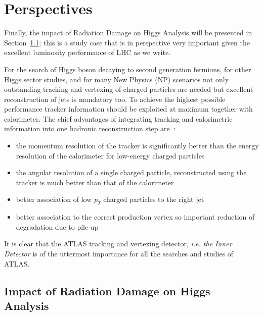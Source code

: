 \chapter{Perspectives}

Finally, the impact of Radiation Damage on Higgs Analysis 
will be presented in Section~\ref{sec:raddamHiggs}; this is a study case that is in 
perspective very important given the excellent luminosity performance of LHC as we write.


For the search of Higgs boson decaying to second generation fermions, for other Higgs sector 
studies, and for many New Physics (NP) scenarios not only outstanding tracking and vertexing of charged particles are needed but  excellent reconstruction of jets is mandatory  too. 
To achieve the highest possible performance tracker information should be exploited at maximum 
together with calorimeter. 
The chief advantages of integrating tracking and calorimetric information into one hadronic reconstruction
step are~\cite{ATLASParticleFlow}:

\begin{itemize}
\item the momentum resolution of the tracker is significantly better than the energy resolution of the
calorimeter for low-energy charged particles
\item the angular resolution of a single charged particle, reconstructed using the tracker is much better
than that of the calorimeter
\item better association of low $p_T$ charged particles to the right jet
\item better association to the correct production vertex so important reduction of degradation due to pile-up  
\end{itemize}

It is clear that the ATLAS tracking and vertexing detector, {\it i.e. the Inner Detector} is of the uttermost importance for all
the searches and studies of ATLAS.

\section{Impact of Radiation Damage on Higgs Analysis}
\label{sec:raddamHiggs}